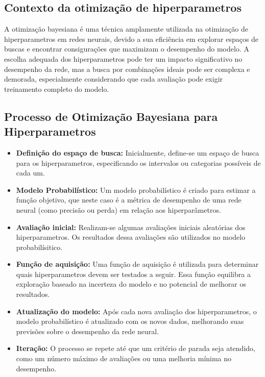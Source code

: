 \documentclass{article}
\begin{document}
\subsection{Contexto da otimização de hiperparametros}
A otimização bayesiana é uma técnica amplamente utilizada na otimização de hiperparametros em redes neurais, devido a sua eficiência em explorar espaços de buscas e encontrar consigurações que maximizam o desempenho do modelo. A escolha adequada dos hiperparametros pode ter um impacto significativo no desempenho da rede, mas a busca por combinações ideais pode ser complexa e demorada, especialmente considerando que cada avaliação pode exigir treinamento completo do modelo.
\subsection{Processo de Otimização Bayesiana para Hiperparametros}
\begin{itemize}
    \item \textbf{Definição do espaço de busca:} Inicialmente, define-se um espaço de busca para os hiperparametros, especificando os intervalos ou categorias possíveis de cada um.
    \item \textbf{Modelo Probabilístico:} Um modelo probabilístico é criado para estimar a função objetivo, que neste caso é a métrica de desempenho de uma rede neural (como precisão ou perda) em relação aos hiperparâmetros.
    \item \textbf{Avaliação inicial:} Realizam-se algumas avaliações iniciais aleatórias dos hiperparametros. Os resultados dessa avaliações são utilizados no modelo probabilísitico.
    \item \textbf{Função de aquisição:} Uma função de aquisição é utilizada para determinar quais hiperparametros devem ser testados a seguir. Essa função equilibra a exploração baseado na incerteza do modelo e no potencial de melhorar os resultados.
    \item \textbf{Atualização do modelo:} Após cada nova avaliação dos hiperparametros, o modelo probabilístico é atualizado com os novos dados, melhorando suas previsões sobre o desempenho da rede neural.
    \item \textbf{Iteração:}  O processo se repete até que um critério de parada seja atendido, como um número máximo de avaliações ou uma melhoria mínima no desempenho.
\end{itemize}
\end{document}
